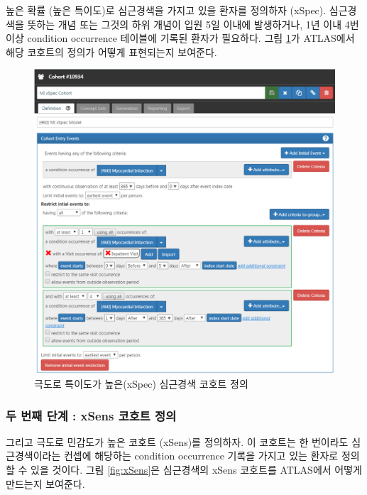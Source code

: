 \documentclass[10.5pt]{book}
\theoremstyle{definition}
\theoremstyle{definition}
\theoremstyle{definition}
\theoremstyle{remark}
\begin{document}
높은 확률 (높은 특이도)로 심근경색을 가지고 있을 환자를 정의하자
(xSpec). 심근경색을 뜻하는 개념 또는 그것의 하위 개념이 입원 5일 이내에
발생하거나, 1년 이내 4번 이상 condition occurrence 테이블에 기록된
환자가 필요하다. 그림 \ref{fig:xSpec}가 ATLAS에서 해당 코호트의 정의가
어떻게 표현되는지 보여준다. 

\begin{figure}

{\centering \includegraphics[width=1\linewidth]{images/ClinicalValidity/xSpec} 

}

\caption{극도로 특이도가 높은(xSpec) 심근경색 코호트 정의}\label{fig:xSpec}
\end{figure}

\subsubsection*{두 번째 단계 : xSens 코호트 정의}\label{---xsens--}

그리고 극도로 민감도가 높은 코호트 (xSens)를 정의하자. 이 코호트는 한
번이라도 심근경색이라는 컨셉에 해당하는 condition occurrence 기록을
가지고 있는 환자로 정의할 수 있을 것이다. 그림 \ref{fig:xSens}은
심근경색의 xSens 코호트를 ATLAS에서 어떻게 만드는지 보여준다.
\end{document}
